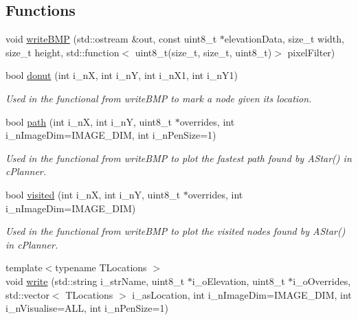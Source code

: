 \subsection*{Functions}
\begin{DoxyCompactItemize}
\item 
void \mbox{\hyperlink{namespacevisualizer_ab4e649cd7413a51ac1ae4b31a2994c3a}{write\+B\+MP}} (std\+::ostream \&out, const uint8\+\_\+t $\ast$elevation\+Data, size\+\_\+t width, size\+\_\+t height, std\+::function$<$ uint8\+\_\+t(size\+\_\+t, size\+\_\+t, uint8\+\_\+t)$>$ pixel\+Filter)
\item 
\mbox{\label{namespacevisualizer_a7ff2fee7ef1cf41bc0f273d730f38abc}} 
bool \mbox{\hyperlink{namespacevisualizer_a7ff2fee7ef1cf41bc0f273d730f38abc}{donut}} (int i\+\_\+nX, int i\+\_\+nY, int i\+\_\+n\+X1, int i\+\_\+n\+Y1)
\begin{DoxyCompactList}\small\item\em Used in the functional from write\+B\+MP to mark a node given its location. \end{DoxyCompactList}\item 
\mbox{\label{namespacevisualizer_a12c362482021eed2a592a9d0254e0ab6}} 
bool \mbox{\hyperlink{namespacevisualizer_a12c362482021eed2a592a9d0254e0ab6}{path}} (int i\+\_\+nX, int i\+\_\+nY, uint8\+\_\+t $\ast$overrides, int i\+\_\+n\+Image\+Dim=I\+M\+A\+G\+E\+\_\+\+D\+IM, int i\+\_\+n\+Pen\+Size=1)
\begin{DoxyCompactList}\small\item\em Used in the functional from write\+B\+MP to plot the fastest path found by A\+Star() in c\+Planner. \end{DoxyCompactList}\item 
\mbox{\label{namespacevisualizer_a147374664b0a7e0a40cae2435d9eab5e}} 
bool \mbox{\hyperlink{namespacevisualizer_a147374664b0a7e0a40cae2435d9eab5e}{visited}} (int i\+\_\+nX, int i\+\_\+nY, uint8\+\_\+t $\ast$overrides, int i\+\_\+n\+Image\+Dim=I\+M\+A\+G\+E\+\_\+\+D\+IM)
\begin{DoxyCompactList}\small\item\em Used in the functional from write\+B\+MP to plot the visited nodes found by A\+Star() in c\+Planner. \end{DoxyCompactList}\item 
{\footnotesize template$<$typename T\+Locations $>$ }\\void \mbox{\hyperlink{namespacevisualizer_a2f66e38c689ff3c3731faa95739bbf25}{write}} (std\+::string i\+\_\+str\+Name, uint8\+\_\+t $\ast$i\+\_\+o\+Elevation, uint8\+\_\+t $\ast$i\+\_\+o\+Overrides, std\+::vector$<$ T\+Locations $>$ i\+\_\+as\+Location, int i\+\_\+n\+Image\+Dim=I\+M\+A\+G\+E\+\_\+\+D\+IM, int i\+\_\+n\+Visualise=A\+LL, int i\+\_\+n\+Pen\+Size=1)

\end{DoxyCompactItemize}
